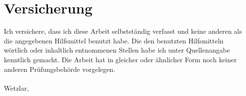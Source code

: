 \section*{Versicherung}\label{section:versicherung}
Ich versichere, dass ich diese Arbeit selbstständig verfasst und keine anderen als die angegebenen Hilfsmittel benutzt habe. Die den benutzten Hilfsmitteln wörtlich oder inhaltlich entnommenen Stellen habe ich unter Quellenangabe kenntlich gemacht. Die Arbeit hat in gleicher oder ähnlicher Form noch keiner anderen Prüfungsbehörde vorgelegen.\\
\\



Wetzlar, \closingDate
